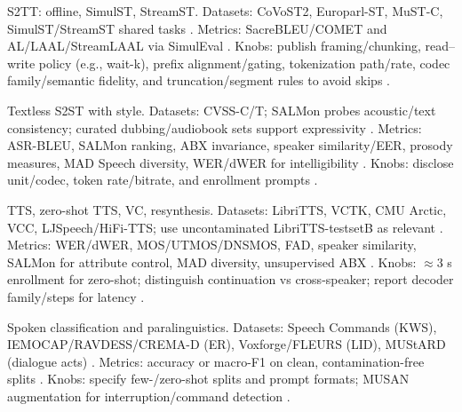 \documentclass{article}
\begin{document}
S2TT: offline, SimulST, StreamST. Datasets: CoVoST2, Europarl-ST, MuST-C, SimulST/StreamST shared tasks \cite{guo2025streamuniachievingstreamingspeechtransla,chen2024bestowefficientstreamablespeechlanguagem}. Metrics: SacreBLEU/COMET and AL/LAAL/StreamLAAL via SimulEval \cite{guo2025streamuniachievingstreamingspeechtransla}. Knobs: publish framing/chunking, read--write policy (e.g., wait-k), prefix alignment/gating, tokenization path/rate, codec family/semantic fidelity, and truncation/segment rules to avoid skips \cite{ye2024codecdoesmatterexploringsemanticshortcom,zhao2024textlessstreamingspeechtranslationsemant}.

Textless S2ST with style. Datasets: CVSS-C/T; SALMon probes acoustic/text consistency; curated dubbing/audiobook sets support expressivity \cite{maimon2025salmonsuiteacousticlanguagemodelevaluati,huang2023holisticcascadesystembenchmarkhumanevalu}. Metrics: ASR-BLEU, SALMon ranking, ABX invariance, speaker similarity/EER, prosody measures, MAD Speech diversity, WER/dWER for intelligibility \cite{fily2024establishingdegreesclosenessbetweenaudio,futeral2025madspeechmeasuresacousticdiversity,qian2025prosodylmuncoveringemergingprosodyproces,wang2024whydospeechlanguagemodelsfailgeneratesem}. Knobs: disclose unit/codec, token rate/bitrate, and enrollment prompts \cite{peng2024mslms2stmultitaskspeechlanguagemodeltext}.

TTS, zero-shot TTS, VC, resynthesis. Datasets: LibriTTS, VCTK, CMU Arctic, VCC, LJSpeech/HiFi-TTS; use uncontaminated LibriTTS-testsetB as relevant \cite{turetzky2024lastlanguagemodelawarespeechtokenization,tseng2025evaluationllmsspeechisoftenflawedtestset}. Metrics: WER/dWER, MOS/UTMOS/DNSMOS, FAD, speaker similarity, SALMon for attribute control, MAD diversity, unsupervised ABX \cite{maimon2025salmonsuiteacousticlanguagemodelevaluati,futeral2025madspeechmeasuresacousticdiversity,fily2024establishingdegreesclosenessbetweenaudio,verma2024whispergpthybridrepresentationaudiolarge}. Knobs: $\approx$3 s enrollment for zero-shot; distinguish continuation vs cross-speaker; report decoder family/steps for latency \cite{wang2024evaluatingtextspeechsynthesislargediscre}.

Spoken classification and paralinguistics. Datasets: Speech Commands (KWS), IEMOCAP/RAVDESS/CREMA-D (ER), Voxforge/FLEURS (LID), MUStARD (dialogue acts) \cite{hsu2024exploringcontextlearningtextlessspeechla}. Metrics: accuracy or macro-F1 on clean, contamination-free splits \cite{tseng2025evaluationllmsspeechisoftenflawedtestset}. Knobs: specify few-/zero-shot splits and prompt formats; MUSAN augmentation for interruption/command detection \cite{ma2024languagemodelcanlistenwhilespeaking}.
\end{document}
